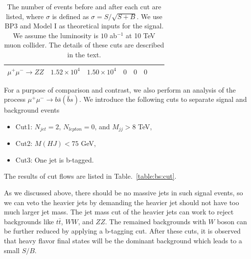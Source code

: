 \documentclass[a4paper,11pt]{article}
\begin{document}
\begin{center}
\begin{table}
\begin{center}
\begin{tabular}{|c|c|c|c|c|c|c|c|}
  $\mu^+\mu^-\to ZZ$  & $1.52\times{10^4}$   & $1.50\times{10^4}$  &  $0$   &  $0$ & $0$  &  & \\
  \hline
  \end{tabular}
  \end{center}
  \caption{The number of events before and after each cut are listed, where $\sigma$ is defined as $\sigma=S/\sqrt{S+B}$. We use BP3 and Model I as theoretical inputs for the signal. We assume the luminosity is $10$ ab$^{-1}$ at 10 TeV muon collider. The details of these cuts are described in the text.\label{table:tc:cut}}
\end{table}
\end{center}

For a purpose of comparison and contrast, we also perform an analysis of the process $\mu^+\mu^-\to b\bar{s}(\bar{b}s)$. We introduce the following cuts to separate signal and background events 
\begin{itemize}
  \item Cut1: $N_{jet}=2$, $N_{lepton}=0$, and $M_{jj}>8$ TeV,
  \item Cut2: $M(HJ)<75$ GeV,
  \item Cut3: One jet is b-tagged.
\end{itemize} 
The results of cut flows are listed in Table.~\ref{table:bs:cut}.

As we discussed above, there should be no massive jets in such signal events, 
so we can veto the heavier jets by demanding the heavier jet should not have too much larger jet mass.
The jet mass cut of the heavier jets can work to reject backgrounds like $t\bar{t}$, $WW$, and $ZZ$.
The remained backgrounds with $W$ boson can be further reduced by applying a b-tagging cut. 
After these cuts, it is observed that heavy flavor final states will be the dominant background which leads to a small $S/B$.
\end{document}
